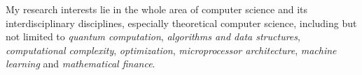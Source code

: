 
My research interests lie in the whole area of computer science
and its interdisciplinary disciplines,
especially theoretical computer science,
including but not limited to
\textit{quantum computation},
\textit{algorithms and data structures},
\textit{computational complexity},
\textit{optimization}, %
\textit{microprocessor architecture},
\textit{machine learning}
and
\textit{mathematical finance}.

\endinput